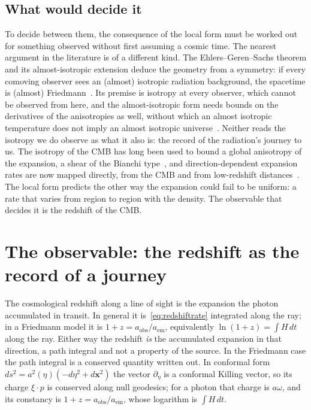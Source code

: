 \documentclass[aps,prd,reprint,amsmath,amssymb,superscriptaddress]{revtex4-2}
\begin{document}
\subsection{What would decide it}\label{sec:decide}

To decide between them, the consequence of the local form must be worked out for something observed without first assuming a cosmic time. The nearest argument in the literature is of a different kind. The Ehlers--Geren--Sachs theorem and its almost-isotropic extension deduce the geometry from a symmetry: if every comoving observer sees an (almost) isotropic radiation background, the spacetime is (almost) Friedmann~\cite{EGS1968, Stoeger1995}. Its premise is isotropy at every observer, which cannot be observed from here, and the almost-isotropic form needs bounds on the derivatives of the anisotropies as well, without which an almost isotropic temperature does not imply an almost isotropic universe~\cite{Nilsson1999}. Neither reads the isotropy we do observe as what it also is: the record of the radiation's journey to us. The isotropy of the CMB has long been used to bound a global anisotropy of the expansion, a shear of the Bianchi type~\cite{CollinsHawking1973, Saadeh2016}, and direction-dependent expansion rates are now mapped directly, from the CMB and from low-redshift distances~\cite{Zhou2025}. The local form predicts the other way the expansion could fail to be uniform: a rate that varies from region to region with the density. The observable that decides it is the redshift of the CMB.

\section{The observable: the redshift as the record of a journey}\label{sec:decomp}

The cosmological redshift along a line of sight is the expansion the photon accumulated in transit. In general it is~\eqref{eq:redshiftrate} integrated along the ray; in a Friedmann model it is $1+z = a_{\mathrm{obs}}/a_{\mathrm{em}}$, equivalently $\ln(1+z) = \int H\,dt$ along the ray. Either way the redshift \emph{is} the accumulated expansion in that direction, a path integral and not a property of the source. In the Friedmann case the path integral is a conserved quantity written out. In conformal form $ds^{2}=a^{2}(\eta)(-d\eta^{2}+d\mathbf{x}^{2})$ the vector $\partial_\eta$ is a conformal Killing vector, so its charge $\xi\!\cdot\!p$ is conserved along null geodesics; for a photon that charge is $a\omega$, and its constancy is $1+z=a_{\mathrm{obs}}/a_{\mathrm{em}}$, whose logarithm is $\int H\,dt$.
\end{document}
